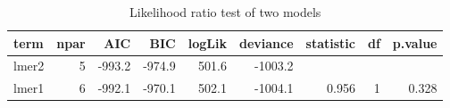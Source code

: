 \begin{table}[ht]
\centering
\caption{Likelihood ratio test of two models} 
\label{Stbl_lmer_LRtest}
\begin{tabular}{lrrrrrrrr}
  \toprule
term & npar & AIC & BIC & logLik & deviance & statistic & df & p.value \\ 
  \midrule
lmer2 & 5 & -993.2 & -974.9 & 501.6 & -1003.2 &  &  &  \\ 
  lmer1 & 6 & -992.1 & -970.1 & 502.1 & -1004.1 & 0.956 & 1 & 0.328 \\ 
   \bottomrule
\end{tabular}
\end{table}
